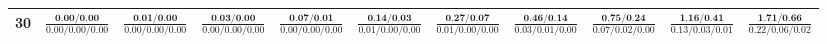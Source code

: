\documentclass{slides}
\begin{document}
{{{\begin{tabular}{|c|c|c|c|c|c|c|c|c|c|c|}
\hline
30 & $\frac{\textbf{0.00/0.00}}{0.00/0.00/0.00}$ & $\frac{\textbf{0.01/0.00}}{0.00/0.00/0.00}$ & $\frac{\textbf{0.03/0.00}}{0.00/0.00/0.00}$ & $\frac{\textbf{0.07/0.01}}{0.00/0.00/0.00}$ & $\frac{\textbf{0.14/0.03}}{0.01/0.00/0.00}$ & $\frac{\textbf{0.27/0.07}}{0.01/0.00/0.00}$ & $\frac{\textbf{0.46/0.14}}{0.03/0.01/0.00}$ & $\frac{\textbf{0.75/0.24}}{0.07/0.02/0.00}$ & $\frac{\textbf{1.16/0.41}}{0.13/0.03/0.01}$ & $\frac{\textbf{1.71/0.66}}{0.22/0.06/0.02}$ \\
\hline
\end{tabular}}}}
\end{document}
